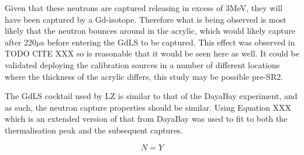 Given that these neutrons are captured releasing in excess of 3MeV, they will have been captured by a Gd-isotope. 
Therefore what is being observed is most likely that the neutron bounces around in the acrylic, which would likely capture after 220$\mu$s before entering the GdLS to be captured.
This effect was observed in TODO CITE XXX so is reasonable that it would be seen here as well.
It could be validated deploying the calibration sources in a number of different locations where the thickness of the acrylic differs, this study may be possible pre-SR2.


\par
The GdLS cocktail used by LZ is similar to that of the DayaBay experiment, and as such, the neutron capture properties should be similar.
Using Equation XXX which is an extended version of that from DayaBay \cite{Dayabay_neutron_capture_fit_ref} was used to fit to both the thermalisation peak and the subsequent captures.

\begin{equation}
    N = Y
\end{equation}

